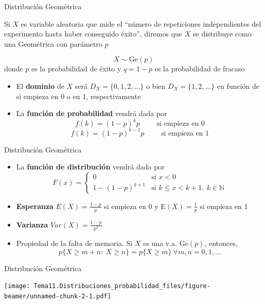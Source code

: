 \documentclass[
  ignorenonframetext,
]{beamer}
\providecommand{\tightlist}{%
  \setlength{\itemsep}{0pt}\setlength{\parskip}{0pt}}
\begin{document}
\begin{frame}{Distribución Geométrica}
\protect\hypertarget{distribuciuxf3n-geomuxe9trica}{}

Si \(X\) es variable aleatoria que mide el ``número de repeticiones
independientes del experimento hasta haber conseguido éxito'', diremos
que \(X\) se distribuye como una Geométrica con parámetro \(p\)

\[X\sim \text{Ge}(p)\] donde \(p\) es la probabilidad de éxito y
\(q = 1-p\) es la probabilidad de fracaso

\begin{itemize}
\item
  El \textbf{dominio} de \(X\) será \(D_X= \{0,1,2,\dots\}\) o bien
  \(D_X = \{1,2,\dots\}\) en función de si empieza en 0 o en 1,
  respectivamente
\item
  La \textbf{función de probabilidad} vendrá dada por
  \[f(k) = (1-p)^{k}p \qquad\text{ si empieza en 0}\]
  \[f(k) = (1-p)^{k-1}p \qquad\text{ si empieza en 1}\]
\end{itemize}

\end{frame}

\begin{frame}{Distribución Geométrica}
\protect\hypertarget{distribuciuxf3n-geomuxe9trica-1}{}

\begin{itemize}
\tightlist
\item
  La \textbf{función de distribución} vendrá dada por \[F(x) = \left\{
  \begin{array}{cl}
     0 & \text{si } x<0 
  \\ 1-(1-p)^{k+1} & \text{si } k\le x<k+1,\ k\in\mathbb{N}
  \end{array}
  \right.\]
\item
  \textbf{Esperanza} \(E(X) = \frac{1-p}{p}\) si empieza en 0 y
  E\((X) = \frac{1}{p}\) si empieza en 1
\item
  \textbf{Varianza} \(Var(X) = \frac{1-p}{p^2}\)
\item
  Propiedad de la falta de memoria. Si \(X\) es una v.a.
  \(\text{Ge}(p)\), entonces,
  \[p\{X\ge m+n:\ X\ge n\} = p\{X\ge m\}\ \forall m,n=0,1,\dots\]
\end{itemize}

\end{frame}

\begin{frame}{Distribución Geométrica}
\protect\hypertarget{distribuciuxf3n-geomuxe9trica-2}{}

\texttt{[image: Tema11.Distribuciones\_probabilidad\_files/figure-beamer/unnamed-chunk-2-1.pdf]}

\end{frame}
\end{document}
